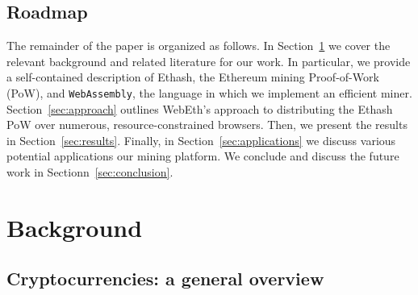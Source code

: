 \documentclass[runningheads]{llncs}
\newcommand{\trishita}[1]{}%
\begin{document}


\subsection{Roadmap}
\trishita{Fix this acc to the new orderigns}
The remainder of the paper is organized as follows. In Section~\ref{sec:background} we cover the relevant background and related literature for our work.  In particular, we provide a self-contained description of Ethash, the Ethereum mining Proof-of-Work (PoW), and \verb|WebAssembly|, the language in which we implement an efficient miner. Section~\ref{sec:approach} outlines WebEth's approach to distributing the Ethash PoW over numerous, resource-constrained browsers. Then, we present the results in Section~\ref{sec:results}. Finally, in Section~\ref{sec:applications} we discuss various potential applications our mining platform. We conclude and discuss the future work in Sectionn~\ref{sec:conclusion}.  

\section{Background}
\label{sec:background}
\subsection{Cryptocurrencies: a general overview}
\end{document}
